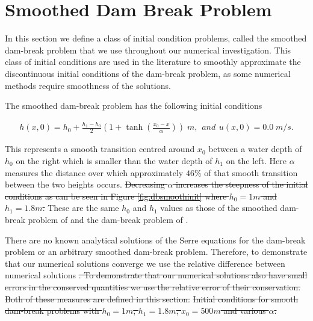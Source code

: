 \documentclass[times]{elsarticle}
\providecommand{\DIFdel}[1]{{\protect\color{red}\sout{#1}}}                      %
\providecommand{\DIFdelbegin}{} %
\providecommand{\DIFdelend}{} %
\providecommand{\DIFdelFL}[1]{\DIFdel{#1}} %
\begin{document}
\DIFdelend %
\section{Smoothed Dam Break Problem}
\label{section:smootheddambreak}
In this section we define a class of initial condition problems, called the smoothed dam-break problem that we use throughout our numerical investigation. This class of initial conditions are used in the literature \cite{Mitsotakis-etal-2014,Mitsotakis-etal-2017} to smoothly approximate the discontinuous initial conditions of the dam-break problem, as some numerical methods require smoothness of the solutions.

The smoothed dam-break problem has the following initial conditions
\begin{linenomath*}
\begin{subequations}
\begin{gather}
h(x,0) = h_0 + \frac{h_1 - h_0}{2}\left(1 + \tanh\left(\frac{x_0 - x}{\alpha}\right)\right)\; m,
\end{gather} 
and
\begin{gather}
u(x,0) = 0.0 \;m/s.
\end{gather}
\label{eq:sdbi}
\end{subequations}
\end{linenomath*}
This represents a smooth transition centred around $x_0$ between a water depth of $h_0$ on the right which is smaller than the water depth of $h_1$ on the left. Here $\alpha$ measures the distance over which approximately $46\%$ of that smooth transition between the two heights occurs. \DIFdelbegin \DIFdel{Decreasing $\alpha$ increases the steepness of the initial conditions as can be seen in Figure \ref{fig:dbsmoothinit} where $h_0=1m$ and $h_1=1.8m$. }\DIFdelend These are the same $h_0$ and $h_1$ values as those of the smoothed dam-break problem of \citet{El-etal-2006} and the dam-break problem of \citet{Hank-etal-2010-2034}.

There are no known analytical solutions of the Serre equations for the dam-break problem or an arbitrary smoothed dam-break problem. Therefore, to demonstrate that our numerical solutions converge we use the relative difference between numerical solutions \DIFdelbegin \DIFdel{. To demonstrate that our numerical solutions also have small errors in the conserved quantities we use the relative error of their conservation. Both of these measures are defined in this section. }%
{%
\DIFdelFL{Initial conditions for smooth dam-break problems with $h_0 = 1m$, $h_1 = 1.8m$, $x_0 =500m$ and various $\alpha$.}}
\end{document}
